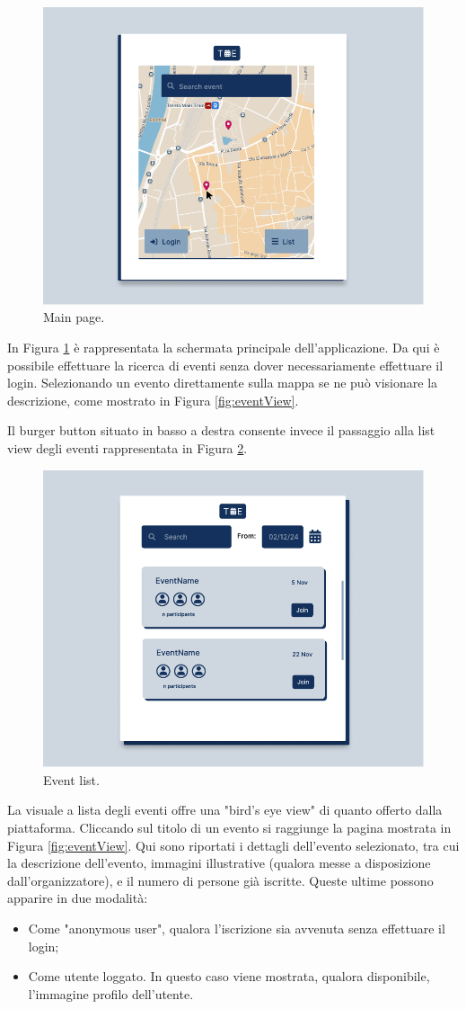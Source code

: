 \documentclass[9pt]{extarticle}
\begin{document}
\begin{figure}[!htb]
	\centering
	\includegraphics[width=.7\linewidth]{./images/MainPage.pdf}
	\caption{Main page.}
	\label{fig:mainPage}
\end{figure}

In Figura \ref{fig:mainPage} è rappresentata la schermata principale dell'applicazione. Da qui è possibile effettuare la ricerca di eventi senza dover necessariamente effettuare il login. Selezionando un evento direttamente sulla mappa se ne può visionare la descrizione, come mostrato in Figura \ref{fig:eventView}.

Il burger button situato in basso a destra consente invece il passaggio alla list view degli eventi rappresentata in Figura \ref{fig:eventListSearch}.

\begin{figure}[!htb]
	\centering
	\includegraphics[width=.7\linewidth]{./images/EventListSearch.pdf}
	\caption{Event list.}
	\label{fig:eventListSearch}
\end{figure}


La visuale a lista degli eventi offre una "bird's eye view" di quanto offerto dalla piattaforma. Cliccando sul titolo di un evento si raggiunge la pagina mostrata in Figura \ref{fig:eventView}. Qui sono riportati i dettagli dell'evento selezionato, tra cui la descrizione dell'evento, immagini illustrative (qualora messe a disposizione dall'organizzatore), e il numero di persone già iscritte. Queste ultime possono apparire in due modalità:
\begin{itemize}
	\item Come "anonymous user", qualora l'iscrizione sia avvenuta senza effettuare il login;
	\item Come utente loggato. In questo caso viene mostrata, qualora disponibile, l'immagine profilo dell'utente.
\end{itemize}
\newpage
\end{document}
